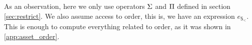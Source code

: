 
As an observation, here we only use operators $\Sigma$ and $\Pi$ defined in section \ref{sec:restrict}. 
We also assume access to order, this is, we have an expression $e_{\mathsf{S_<}}$. This is enough to 
compute everything related to order, as it was shown in \ref{app:asset_order}.






